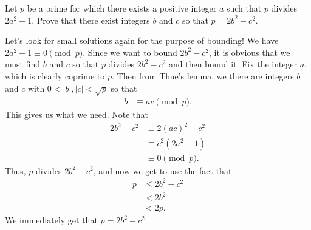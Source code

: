 \documentclass{subfile}
\begin{document}
	\begin{problem}
		Let $p$ be a prime for which there exists a positive integer $a$ such that $p$ divides $2a^2-1$. Prove that there exist integers $b$ and $c$ so that $p=2b^2-c^2$.
	\end{problem}
	
	\begin{solution}
		Let's look for small solutions again for the purpose of bounding! We have $2a^2-1\equiv0\pmod p$. Since we want to bound $2b^2-c^2$, it is obvious that we must find $b$ and $c$ so that $p$ divides $2b^2-c^2$ and then bound it. Fix the integer $a$, which is clearly coprime to $p$. Then from Thue's lemma, we there are integers $b$ and $c$ with $0<|b|,|c|<\sqrt{p}$ so that
		\begin{align*}
			b & \equiv ac\pmod p.
		\end{align*}
		This gives us what we need. Note that
		\begin{align*}
			2b^2-c^2 & \equiv 2(ac)^2-c^2\\
			& \equiv c^2(2a^2-1)\\
			& \equiv 0\pmod p.
		\end{align*}
		Thus, $p$ divides $2b^2-c^2$, and now we get to use the fact that
		\begin{align*}
			p & \leq 2b^2-c^2\\ 
			& < 2b^2 \\
			& < 2p.
		\end{align*}
		We immediately get that $p=2b^2-c^2$.
	\end{solution}

	
\end{document}
